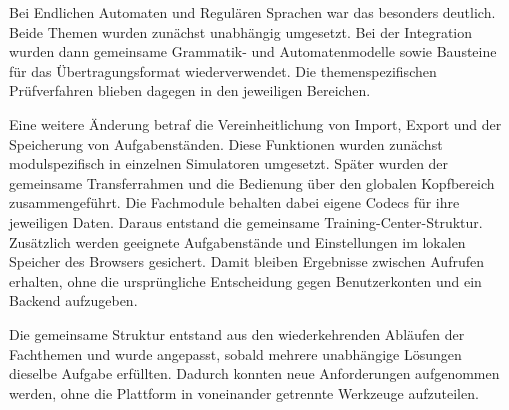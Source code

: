 Bei Endlichen Automaten und Regulären Sprachen war das besonders deutlich. Beide Themen
wurden zunächst unabhängig umgesetzt. Bei der Integration wurden dann gemeinsame Grammatik-
und Automatenmodelle sowie Bausteine für das Übertragungsformat wiederverwendet. Die
themenspezifischen Prüfverfahren blieben dagegen in den jeweiligen Bereichen.

Eine weitere Änderung betraf die Vereinheitlichung von Import, Export und der Speicherung
von Aufgabenständen. Diese Funktionen wurden zunächst modulspezifisch in einzelnen
Simulatoren umgesetzt. Später wurden der gemeinsame Transferrahmen und die Bedienung über
den globalen Kopfbereich zusammengeführt. Die Fachmodule behalten dabei eigene Codecs für
ihre jeweiligen Daten. Daraus entstand die gemeinsame Training-Center-Struktur. Zusätzlich
werden geeignete Aufgabenstände und Einstellungen im lokalen Speicher des Browsers
gesichert. Damit bleiben Ergebnisse zwischen Aufrufen erhalten, ohne die ursprüngliche
Entscheidung gegen Benutzerkonten und ein Backend aufzugeben.

Die gemeinsame Struktur entstand aus den wiederkehrenden Abläufen der Fachthemen und wurde
angepasst, sobald mehrere unabhängige Lösungen dieselbe Aufgabe erfüllten. Dadurch konnten neue
Anforderungen aufgenommen werden, ohne die Plattform in voneinander getrennte Werkzeuge
aufzuteilen.
